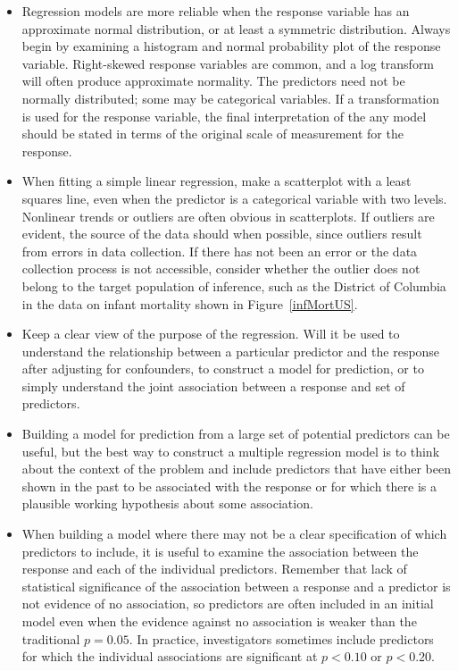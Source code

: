 \begin{itemize}
	
	\item Regression models are more reliable when the response variable has an approximate normal distribution, or at least a symmetric distribution.  Always begin by examining a histogram and normal probability plot of the response variable.  Right-skewed response variables are common, and a log transform will often produce approximate normality. The predictors need not be normally distributed; some may be categorical variables.  If a transformation is used for the response variable, the final interpretation of the any model should be stated in terms of the original scale of measurement for the response.
	
	\item When fitting a simple linear regression, make a scatterplot with a least squares line, even when the predictor is a categorical variable with two levels.  Nonlinear trends or outliers are often obvious in scatterplots.  If outliers are evident, the source of the data should when possible, since outliers result from errors in data collection.  If there has not been an error or the data collection process is not accessible, consider whether the outlier does not belong to the target population of inference, such as the District of Columbia in the data on infant mortality shown in Figure~\ref{infMortUS}.
	
	\item Keep a clear view of the purpose of the regression.  Will it be used to understand the relationship between a particular predictor and the response after adjusting for confounders, to construct a model for prediction, or to simply understand the joint association between a response and set of predictors.
	
	\item Building a model for prediction from a large set of potential predictors can be useful, but the best way to construct a multiple regression model is to think about the context of the problem and include predictors that have either been shown in the past to be associated with the response or for which there is a plausible working hypothesis about some association.
	
	\item When building a model where there may not be a clear specification of which predictors to include, it is useful to examine the association between the response and each of the individual predictors.  Remember that lack of statistical significance of the association between a response and a predictor is not evidence of no association, so predictors are often included in an initial model even when the evidence against no association is weaker than the traditional $p=0.05$.  In practice, investigators sometimes include predictors for which the individual associations are significant at $p < 0.10$ or $p < 0.20$.
	

\end{itemize}
